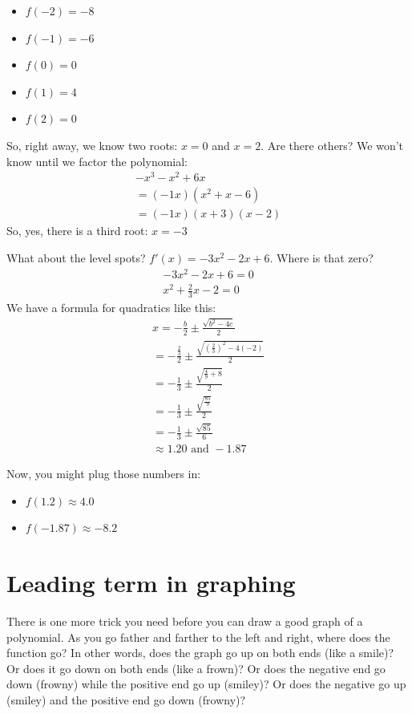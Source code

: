 \begin{itemize}
\item $f(-2) = -8$
\item $f(-1) = -6$
\item $f(0) = 0$
\item $f(1) = 4$
\item $f(2) = 0$ 
\end{itemize}

So, right away, we know two roots: $x = 0$ and $x = 2$. Are there
others? We won't know until we factor the polynomial:
\begin{multline*}
  -x^3 -x^2 + 6x \\
  = (-1x)(x^2 + x - 6) \\
  = (-1x)(x + 3)(x - 2)
\end{multline*}
So, yes, there is a third root: $x = -3$

What about the level spots? $f'(x) = -3x^2 - 2x + 6$. Where is that zero?
\begin{multline*}
  -3x^2 -2x + 6 = 0 \\
  x^2 + \frac{2}{3}x - 2 = 0
\end{multline*}
We have a formula for quadratics like this:
\begin{multline*}
  x = -\frac{b}{2} \pm \frac{\sqrt{b^2 - 4c}}{2} \\
  = -\frac{\frac{2}{3}}{2} \pm \frac{\sqrt{\left(\frac{2}{3}\right)^2 - 4(-2)}}{2} \\
  = -\frac{1}{3} \pm \frac{\sqrt{\frac{4}{9} + 8}}{2} \\
  = -\frac{1}{3} \pm \frac{\sqrt{\frac{85}{9}}}{2} \\
  = -\frac{1}{3} \pm \frac{\sqrt{85}}{6} \\
  \approx 1.20 \text{ and } -1.87 
\end{multline*}

Now, you might plug those numbers in:
\begin{itemize}
\item $f(1.2) \approx 4.0 $
\item $f(-1.87) \approx -8.2$
\end{itemize}

\section{Leading term in graphing}

There is one more trick you need before you can draw a good graph of a
polynomial. As you go father and farther to the left and right, where
does the function go? In other words, does the graph go up on both ends
(like a smile)? Or does it go down on both ends (like a frown)? Or
does the negative end go down (frowny) while the positive end go up
(smiley)? Or does the negative go up (smiley) and the positive end go
down (frowny)?

